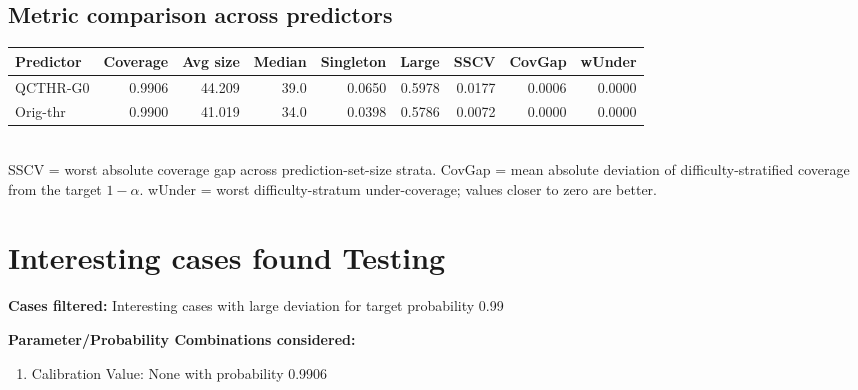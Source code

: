 \documentclass[parskip=half]{scrartcl}
\begin{document}
\subsection{Metric comparison across predictors}
\begin{tabular}{l r r r r r r r r}
\hline
Predictor & Coverage & Avg size & Median & Singleton & Large & SSCV & CovGap & wUnder \\
\hline
QCTHR-G0 & 0.9906 & 44.209 & 39.0 & 0.0650 & 0.5978 & 0.0177 & 0.0006 & 0.0000 \\
Orig-thr & 0.9900 & 41.019 & 34.0 & 0.0398 & 0.5786 & 0.0072 & 0.0000 & 0.0000 \\
\hline
\end{tabular}\\[0.5em]
\textsf{\scriptsize SSCV = worst absolute coverage gap across prediction-set-size strata. CovGap = mean absolute deviation of difficulty-stratified coverage from the target $1-\alpha$. wUnder = worst difficulty-stratum under-coverage; values closer to zero are better.}\\
\section{Interesting cases found Testing}
\textbf{Cases filtered:} Interesting cases with large deviation for target probability 0.99


\textbf{Parameter/Probability Combinations considered:}\begin{enumerate}
\item Calibration Value: None with probability 0.9906
\end{enumerate}
        
\end{document}
